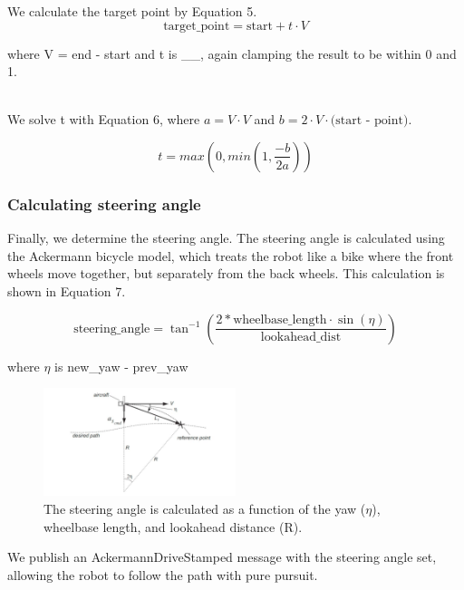 \documentclass{article}
\begin{document}
We calculate the target point by Equation 5.
\begin{equation}
    \text{target\_point} = \text{start} + t \cdot V
\end{equation}

where V = end - start and t is \_\_, again clamping the result to be within 0 and 1. 

\\We solve t with Equation 6, where $a = V \cdot V$ and $b = 2 \cdot V \cdot \text{(start - point)}$.

\begin{equation}
    t = max\left(0, min\left(1, \frac{-b}{2a}\right)\right)
\end{equation}


\subsubsection{Calculating steering angle}
Finally, we determine the steering angle. The steering angle is calculated using the Ackermann bicycle model, which treats the robot like a bike where the front wheels move together, but separately from the back wheels. This calculation is shown in Equation 7.
 
\begin{equation}
    \text{steering\_angle} = \tan^{-1} \left( \frac{2*\text{wheelbase\_length} \cdot \sin {(\eta)}}  {\text{lookahead\_dist}} \right)
\end{equation}

where $\eta$ is new\_yaw - prev\_yaw\\

\begin{figure}[h]
\begin{center}
    \includegraphics[width=0.5\textwidth]{pure_pursuit_diagram.jpg}
    \caption{The steering angle is calculated as a function of the yaw ($\eta$), wheelbase length, and lookahead distance (R).}
\end{center}
\end{figure}

We publish an AckermannDriveStamped message with the steering angle set, allowing the robot to follow the path with pure pursuit.
\end{document}
